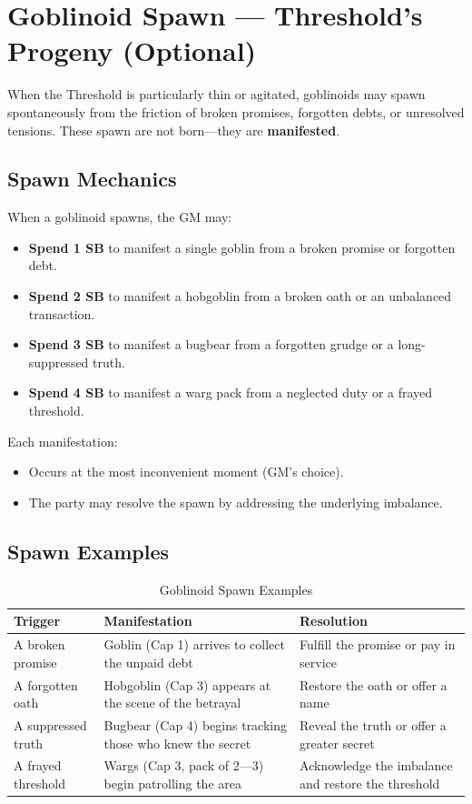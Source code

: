 \section{Goblinoid Spawn --- Threshold's Progeny (Optional)}

When the Threshold is particularly thin or agitated, goblinoids may spawn spontaneously from the friction of broken promises, forgotten debts, or unresolved tensions. These spawn are not born---they are \textbf{manifested}.

\subsection{Spawn Mechanics}

When a goblinoid spawns, the GM may:

\begin{itemize}
    \item \textbf{Spend 1 SB} to manifest a single goblin from a broken promise or forgotten debt.
    \item \textbf{Spend 2 SB} to manifest a hobgoblin from a broken oath or an unbalanced transaction.
    \item \textbf{Spend 3 SB} to manifest a bugbear from a forgotten grudge or a long-suppressed truth.
    \item \textbf{Spend 4 SB} to manifest a warg pack from a neglected duty or a frayed threshold.
\end{itemize}

Each manifestation:
\begin{itemize}
    \item Occurs at the most inconvenient moment (GM's choice).
    \item The party may resolve the spawn by addressing the underlying imbalance.
\end{itemize}

\subsection{Spawn Examples}

\begin{table}[h]
\centering
\begin{tabular}{|l|l|l|}
\hline
\textbf{Trigger} & \textbf{Manifestation} & \textbf{Resolution} \\
\hline
A broken promise & Goblin (Cap 1) arrives to collect the unpaid debt & Fulfill the promise or pay in service \\
A forgotten oath & Hobgoblin (Cap 3) appears at the scene of the betrayal & Restore the oath or offer a name \\
A suppressed truth & Bugbear (Cap 4) begins tracking those who knew the secret & Reveal the truth or offer a greater secret \\
A frayed threshold & Wargs (Cap 3, pack of 2---3) begin patrolling the area & Acknowledge the imbalance and restore the threshold \\
\hline
\end{tabular}
\caption{Goblinoid Spawn Examples}
\end{table}

